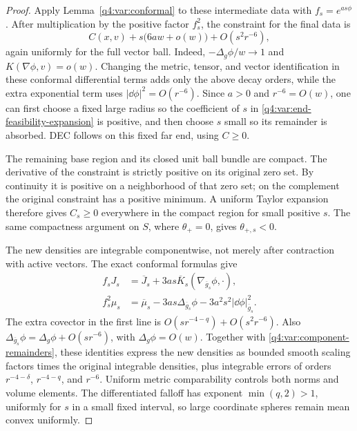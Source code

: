 \begin{proof}
Apply Lemma~\ref{q4:var:conformal} to these intermediate data with
$f_s=e^{as\phi}$. After multiplication by the positive factor $f_s^2$, the
constraint for the final data is
\begin{equation}
 C(x,v)+s\bigl(6aw+o(w)\bigr)+O(s^2r^{-6}),
\label{q4:var:end-feasibility-expansion}
\end{equation}
again uniformly for the full vector ball. Indeed,
$-\Delta_g\phi/w\to1$ and $K(\nabla\phi,v)=o(w)$. Changing the metric,
tensor, and vector identification in these conformal differential terms
adds only the above decay orders, while the extra exponential term uses
$|\dd\phi|^2=O(r^{-6})$. Since $a>0$ and
$r^{-6}=O(w)$, one can first choose a fixed large radius so the coefficient
of $s$ in \eqref{q4:var:end-feasibility-expansion} is positive, and then
choose $s$ small so its remainder is absorbed. DEC follows on this fixed
far end, using $C\ge0$.

The remaining base region and its closed unit ball bundle are compact.
The derivative of the constraint is strictly positive on its original
zero set. By continuity it is positive on a neighborhood of that zero
set; on the complement the original constraint has a positive minimum.
A uniform Taylor expansion therefore gives $C_s\ge0$ everywhere in the
compact region for small positive $s$. The same compactness argument on
$S$, where $\theta_+=0$, gives $\theta_{+,s}<0$.

The new densities are integrable componentwise, not merely after
contraction with active vectors. The exact conformal formulas give
\begin{align*}
 f_sJ_s&=\overline J_s+
            3as\overline K_s(\nabla_{\overline g_s}\phi,\cdot),\\
 f_s^2\mu_s&=\overline\mu_s-3as\Delta_{\overline g_s}\phi
                          -3a^2s^2|\dd\phi|_{\overline g_s}^2.
\end{align*}
The extra covector in the first line is
$O(sr^{-4-q})+O(s^2r^{-6})$. Also
$\Delta_{\overline g_s}\phi=\Delta_g\phi+O(sr^{-6})$, with
$\Delta_g\phi=O(w)$. Together with
\eqref{q4:var:component-remainders}, these identities express the new
densities as bounded smooth scaling factors times the original integrable
densities, plus integrable errors of orders $r^{-4-\delta}$,
$r^{-4-q}$, and $r^{-6}$. Uniform metric comparability controls both norms
and volume elements. The differentiated falloff has
exponent $\min(q,2)>1$, uniformly for $s$ in a small fixed interval, so
large coordinate spheres remain mean convex uniformly.


\end{proof}
